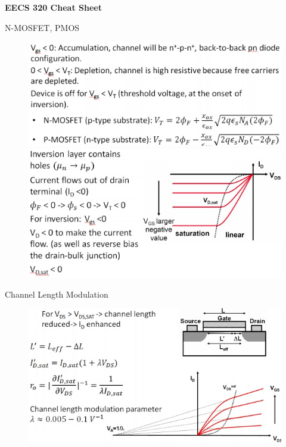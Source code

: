 \documentclass[11pt,landscape]{article}
\begin{document}
\raggedright
\footnotesize


\setlength{\premulticols}{1pt}
\setlength{\postmulticols}{1pt}
\setlength{\multicolsep}{1pt}
\setlength{\columnsep}{2pt}

\begin{center}
     \Large{\textbf{EECS 320 Cheat Sheet}} \\
\end{center}

\begin{multicols}{3}
\setlength{\premulticols}{1pt}
\setlength{\postmulticols}{1pt}
\setlength{\multicolsep}{1pt}
\setlength{\columnsep}{2pt}

N-MOSFET, PMOS
\begin{figure}[H]
    \includegraphics[scale=0.5]{./Images/3/1.jpg}
    \includegraphics[scale=0.55]{./Images/3/2.jpg}
\end{figure}

Channel Length Modulation
\begin{figure}[H]
    \includegraphics[scale=0.5]{./Images/3/3.jpg}
\end{figure}


\end{multicols}
\end{document}
